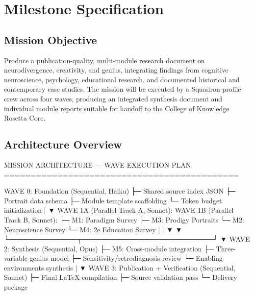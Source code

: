 \documentclass[11pt,letterpaper]{article}
\newcommand{\stageheader}[2]{%
  \noindent\colorbox{#2}{\makebox[\textwidth][l]{%
    \textcolor{white}{\bfseries\sffamily\hspace{6pt}#1\hspace{6pt}}}}%
  \vspace{0.5em}\par%
}
\begin{document}
\newpage
\stageheader{STAGE 3 --- MISSION PACKAGE}{tertiary}

\section{Milestone Specification}

\subsection{Mission Objective}

Produce a publication-quality, multi-module research document on neurodivergence, creativity, and genius, integrating findings from cognitive neuroscience, psychology, educational research, and documented historical and contemporary case studies. The mission will be executed by a Squadron-profile crew across four waves, producing an integrated synthesis document and individual module reports suitable for handoff to the College of Knowledge Rosetta Core.

\subsection{Architecture Overview}

\begin{asciibox}
MISSION ARCHITECTURE — WAVE EXECUTION PLAN
============================================

WAVE 0: Foundation (Sequential, Haiku)
  ├─ Shared source index JSON
  ├─ Portrait data schema
  ├─ Module template scaffolding
  └─ Token budget initialization
         |
         ▼
WAVE 1A (Parallel Track A, Sonnet):        WAVE 1B (Parallel Track B, Sonnet):
  ├─ M1: Paradigm Survey                     ├─ M3: Prodigy Portraits
  └─ M2: Neuroscience Survey                 └─ M4: 2e Education Survey
         |                                          |
         ▼                                          ▼
         └──────────────┬───────────────────────────┘
                        ▼
WAVE 2: Synthesis (Sequential, Opus)
  ├─ M5: Cross-module integration
  ├─ Three-variable genius model
  ├─ Sensitivity/retrodiagnosis review
  └─ Enabling environments synthesis
         |
         ▼
WAVE 3: Publication + Verification (Sequential, Sonnet)
  ├─ Final LaTeX compilation
  ├─ Source validation pass
  └─ Delivery package
\end{asciibox}
\end{document}
